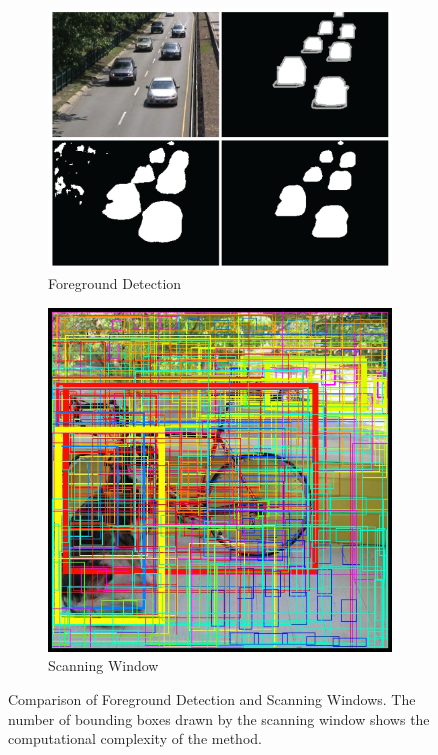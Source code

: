 \begin{figure}[ht]
	\begin{subfigure}[b]{.5\textwidth}
		\centering
		\includegraphics[width=.9\linewidth]{img/chapter2_background/robustBackgroundSubtraction.png}
		\caption{Foreground Detection \cite{Zeng2017}}
	\end{subfigure}%
	\hspace{\fill} 
	\begin{subfigure}[b]{.5\textwidth}
		\centering
		\includegraphics[width=.675\linewidth]{img/chapter2_background/yoloBBBoxes.png}
		\caption{Scanning Window \cite{Redmon}}
	\end{subfigure}
	\vspace{-2\baselineskip}
	\begin{center}
		
		\caption{Comparison of Foreground Detection and Scanning Windows. The number of bounding boxes drawn by the scanning window shows the computational complexity of the method.}
		\label{fig:foregroundVsScanning}
	\end{center}
	\vspace{-2\baselineskip}
\end{figure}

